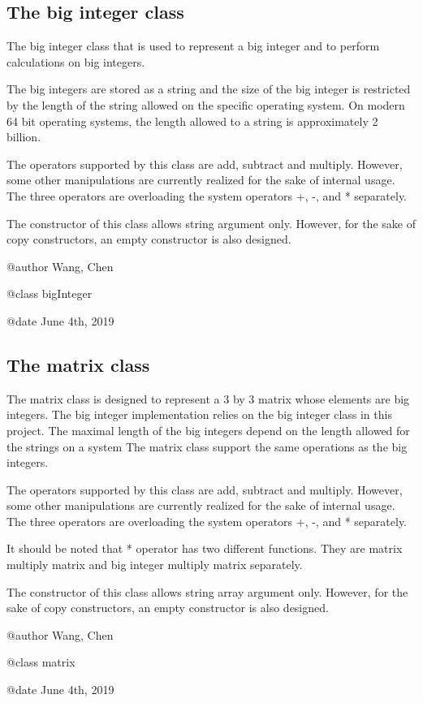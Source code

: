 \documentclass[a4paper]{report}
\begin{document}
\subsection{The big integer class}
The big integer class that is used to represent a big integer and to
perform calculations on big integers.
\par
The big integers are stored as a string and the size of the big integer
is restricted by the length of the string allowed on the specific operating
system. On modern 64 bit operating systems, the length allowed to a string
is approximately 2 billion.
\par
The operators supported by this class are add, subtract and multiply.
However, some other manipulations are currently realized for the sake of
internal usage. The three operators are overloading the system operators
+, -, and * separately.
\par
The constructor of this class allows string argument only. However, for
the sake of copy constructors, an empty constructor is also designed.
\par
@author Wang, Chen
\par
@class bigInteger
\par
@date June 4th, 2019

\subsection{The matrix class}
The matrix class is designed to represent a 3 by 3 matrix whose
elements are big integers. The big integer implementation relies
on the big integer class in this project. The maximal length of the
big integers depend on the length allowed for the strings on a system
The matrix class support the same operations as the big integers.
\par
The operators supported by this class are add, subtract and multiply.
However, some other manipulations are currently realized for the sake of
internal usage. The three operators are overloading the system operators
+, -, and * separately.
\par
It should be noted that * operator has two different functions. They are
matrix multiply matrix and big integer multiply matrix separately.
\par
The constructor of this class allows string array argument only. However, for
the sake of copy constructors, an empty constructor is also designed.
\par
@author Wang, Chen
\par
@class matrix
\par
@date June 4th, 2019
\end{document}
